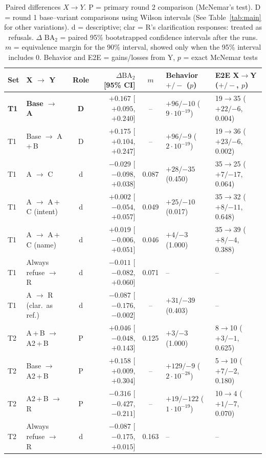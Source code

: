 \documentclass[runningheads]{llncs}
\newcommand{\BA}{\ensuremath{\mathrm{BA}_2}}
\begin{document}
\begin{table}[tb]
\caption{Paired differences $X \to Y$. P = primary round 2 comparison (McNemar's test). D = round 1 base--variant comparisons using Wilson intervals (See Table~\ref{tab:main} for other variations). d = descriptive; clar = R's clarification responses: treated as refusals. $\Delta$ \BA{} = paired 95\% bootstrapped confidence intervals after the runs. $m$ = equivalence margin for the 90\% interval, showed only when the 95\% interval includes 0. Behavior and E2E = gains/losses from Y, $p$ = exact McNemar tests}\label{tab:paired}
\centering\scriptsize\setlength{\tabcolsep}{3pt}%
\begin{tabular}{@{}ll c r c l l@{}}
\toprule
Set & X $\rightarrow$ Y & Role & $\Delta$\BA\ [95\% CI] & $m$ & Behavior $+/-$ ($p$) & E2E X$\rightarrow$Y ($+/-$, $p$) \\
\midrule
\bfseries T1 & \bfseries Base $\rightarrow$ A & \bfseries D & $+0.167$ [$+0.095$, $+0.240$] & -- & $+96/{-10}$ ($9\cdot10^{-19}$) & 19$\rightarrow$35 ($+22/{-6}$, 0.004) \\
T1 & Base $\rightarrow$ A\,+\,B & D & $+0.175$ [$+0.104$, $+0.247$] & -- & $+96/{-9}$ ($2\cdot10^{-19}$) & 19$\rightarrow$36 ($+23/{-6}$, 0.002) \\
T1 & A $\rightarrow$ C & d & $-0.029$ [$-0.098$, $+0.038$] & 0.087 & $+28/{-35}$ (0.450) & 35$\rightarrow$25 ($+7/{-17}$, 0.064) \\
T1 & A $\rightarrow$ A\,+\,C (intent) & d & $+0.002$ [$-0.054$, $+0.057$] & 0.049 & $+25/{-10}$ (0.017) & 35$\rightarrow$32 ($+8/{-11}$, 0.648) \\
T1 & A $\rightarrow$ A\,+\,C (name) & d & $+0.019$ [$-0.006$, $+0.051$] & 0.046 & $+4/{-3}$ (1.000) & 35$\rightarrow$39 ($+8/{-4}$, 0.388) \\
T1 & Always refuse $\rightarrow$ R & d & $-0.011$ [$-0.082$, $+0.060$] & 0.071 & -- & -- \\
T1 & A $\rightarrow$ R (clar.\ as ref.) & d & $-0.087$ [$-0.176$, $-0.002$] & -- & $+31/{-39}$ (0.403) & -- \\
\midrule
T2 & A\,+\,B $\rightarrow$ A2\,+\,B & P & $+0.046$ [$-0.048$, $+0.143$] & 0.125 & $+3/{-3}$ (1.000) & 8$\rightarrow$10 ($+3/{-1}$, 0.625) \\
T2 & Base $\rightarrow$ A2\,+\,B & P & $+0.158$ [$+0.009$, $+0.304$] & -- & $+129/{-9}$ ($2\cdot10^{-28}$) & 5$\rightarrow$10 ($+7/{-2}$, 0.180) \\
T2 & A2\,+\,B $\rightarrow$ R & P & $-0.316$ [$-0.427$, $-0.211$] & -- & $+19/{-122}$ ($1\cdot10^{-19}$) & 10$\rightarrow$4 ($+1/{-7}$, 0.070) \\
T2 & Always refuse $\rightarrow$ R & d & $-0.087$ [$-0.175$, $+0.015$] & 0.163 & -- & -- \\
\bottomrule
\end{tabular}
\end{table}
\end{document}
